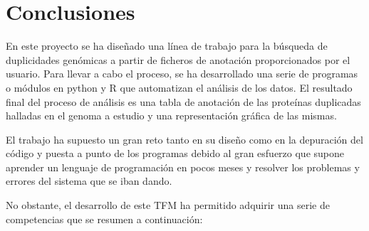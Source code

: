 \chapter*{Conclusiones}
\label{chapter:conclusiones}






En este proyecto se ha diseñado una línea de trabajo para la búsqueda de duplicidades genómicas a partir de ficheros de anotación proporcionados por el usuario. Para llevar a cabo el proceso, se ha desarrollado una serie de programas o módulos en python y R que automatizan el análisis de los datos. El resultado final del proceso de análisis es una tabla de anotación de las proteínas duplicadas halladas en el genoma a estudio y una representación gráfica de las mismas.

El trabajo ha supuesto un gran reto tanto en su diseño como en la depuración del código y puesta a punto de los programas debido al gran esfuerzo que supone aprender un lenguaje de programación en pocos meses y resolver los problemas y errores del sistema que se iban dando.

No obstante, el desarrollo de este TFM ha permitido adquirir una serie de competencias que se resumen a continuación:

